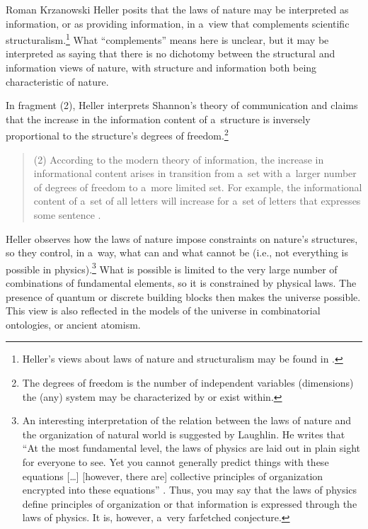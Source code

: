 \begin{artengenv}{Roman Krzanowski}
Heller posits that the laws of nature may be interpreted as information, or as providing information, in a~view that complements scientific structuralism.\footnote{Heller's views about laws of nature and structuralism may be found in 
\parencite[][]{heller_filozofia_2009}.%
} What ``complements'' means here is unclear, but it may be interpreted as saying that there is no dichotomy between the structural and information views of nature, with structure and information both being characteristic of nature.



In fragment (2), Heller interprets Shannon's theory of communication and claims that the increase in the information content of a~structure is inversely proportional to the structure's degrees of freedom.\footnote{The degrees of freedom is the number of independent variables (dimensions) the (any) system may be characterized by or exist within.}



\begin{quote}
(2) According to the modern theory of information, the increase in informational content arises in transition from a~set with a~larger number of degrees of freedom to a~more limited set. For example, the informational content of a~set of all letters will increase for a~set of letters that expresses some sentence 
\parencite[][pp.62–63]{heller_filozofia_2009}.%

\end{quote}



Heller observes how the laws of nature impose constraints on nature's structures, so they control, in a~way, what can and what cannot be (i.e., not everything is possible in physics).\footnote{An interesting interpretation of the relation between the laws of nature and the organization of natural world is suggested by Laughlin. He writes that ``At the most fundamental level, the laws of physics are laid out in plain sight for everyone to see. Yet you cannot generally predict things with these equations […] [however, there are] collective principles of organization encrypted into these equations'' 
\parencite[][p.36]{laughlin_crime_2008}. %
 Thus, you may say that the laws of physics define principles of organization or that information is expressed through the laws of physics. It is, however, a~very farfetched conjecture.} What is possible is limited to the very large number of combinations of fundamental elements, so it is constrained by physical laws. The presence of quantum or discrete building blocks then makes the universe possible. This view is also reflected in the models of the universe in combinatorial ontologies, or ancient atomism.




\end{artengenv}
